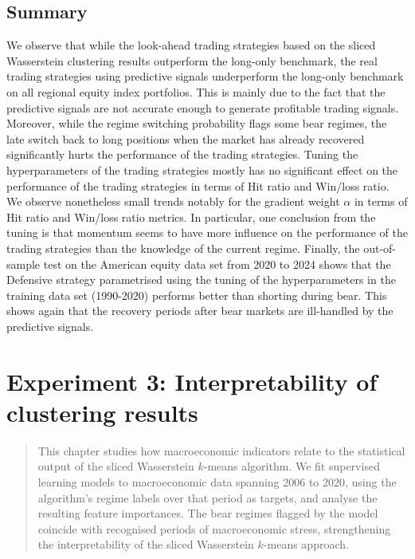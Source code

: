 \documentclass[12pt,a4paper]{report}
\begin{document}
\section{Summary}
We observe that while the look-ahead trading strategies based on the sliced Wasserstein clustering results outperform the long-only benchmark, the real trading strategies using predictive signals underperform the long-only benchmark on all 
regional equity index portfolios. 
This is mainly due to the fact that the predictive signals are not accurate enough to generate profitable trading signals. 
Moreover, while the regime switching probability flags some bear regimes, the late switch back to long positions when the market has already recovered significantly hurts the performance of the trading strategies.
Tuning the hyperparameters of the trading strategies mostly has no significant effect on the performance of the trading strategies in terms of Hit ratio and Win/loss ratio.
We observe nonetheless small trends notably for the gradient weight $\alpha$ in terms of Hit ratio and Win/loss ratio metrics. In particular, one conclusion from the tuning is that momentum seems to have more influence on the performance of the trading strategies than the knowledge of the current regime. 
Finally, the out-of-sample test on the American equity data set from 2020 to 2024 shows that the Defensive strategy parametrised using the tuning of the hyperparameters in the training data set (1990-2020) performs better than shorting during bear.
This shows again that the recovery periods after bear markets are ill-handled by the predictive signals.

\chapter{Experiment 3: Interpretability of clustering results}

\begin{quote}
This chapter studies how macroeconomic indicators relate to the statistical output
of the sliced Wasserstein $k$-means algorithm. We fit supervised learning models to
macroeconomic data spanning 2006 to 2020, using the algorithm's regime labels over
that period as targets, and analyse the resulting feature importances. The bear
regimes flagged by the model coincide with recognised periods of macroeconomic
stress, strengthening the interpretability of the sliced Wasserstein $k$-means approach.
\end{quote}
\end{document}

